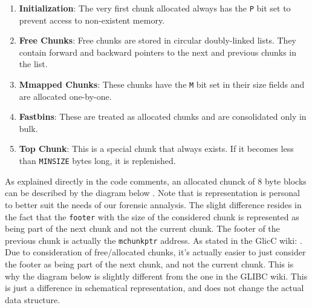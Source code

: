     \begin{enumerate}
        \item \textbf{Initialization}: The very first chunk allocated always has the \texttt{P} bit set to prevent access to non-existent memory.
        
        \item \textbf{Free Chunks}: Free chunks are stored in circular doubly-linked lists. They contain forward and backward pointers to the next and previous chunks in the list.
        
        \item \textbf{Mmapped Chunks}: These chunks have the \texttt{M} bit set in their size fields and are allocated one-by-one.
        
        \item \textbf{Fastbins}: These are treated as allocated chunks and are consolidated only in bulk.
        
        \item \textbf{Top Chunk}: This is a special chunk that always exists. If it becomes less than \texttt{MINSIZE} bytes long, it is replenished.
    \end{enumerate}

    As explained directly in the code comments, an allocated chunck of 8 byte blocks can be described by the diagram below \cite{MallocGLIBC2001}. Note that is representation is personal to better suit the needs of our forensic annalysis. The slight difference resides in the fact that the \texttt{footer} with the size of the considered chunk is represented as being part of the next chunk and not the current chunk. The footer of the previous chunk is actually the \texttt{mchunkptr} address. As stated in the GlicC wiki:  \cite{MallocInternalsWiki2023}. Due to consideration of free/allocated chunks, it's actually easier to just consider the footer as being part of the next chunk, and not the current chunk. This is why the diagram below is slightly different from the one in the GLIBC wiki. This is just a difference in schematical representation, and does not change the actual data structure.

